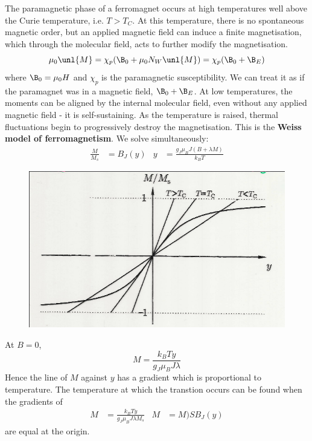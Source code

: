 \documentclass[a4paper, 11pt, normalem]{report}
\begin{document}
The paramagnetic phase of a ferromagnet occurs at high temperatures well above the Curie temperature, i.e. $T > T_C$.
At this temperature, there is no spontaneous magnetic order, but an applied magnetic field can induce a finite magnetisation, which through the molecular field, acts to further modify the magnetisation.
\begin{equation}
    \mu_0\unl{M} = \chi_p(\B_0 + \mu_0N_W\unl{M}) = \chi_p(\B_0 + \B_E)
\end{equation}
where $\B_0 = \mu_0H$ and $\chi_p$ is the paramagnetic susceptibility. 
We can treat it as if the paramagnet was in a magnetic field, $\B_0 + \B_E$.
At low temperatures, the moments can be aligned by the internal molecular field, even without any applied magnetic field - it is self-sustaining. 
As the temperature is raised, thermal fluctuations begin to progressively destroy the magnetisation.
This is the \textbf{Weiss model of ferromagnetism}.
We solve simultaneously:
\begin{align}
    \frac{M}{M_s} &= B_J(y) & y &= \frac{g_J\mu_BJ(B + \lambda M)}{k_BT}
\end{align}
\begin{figure}[H]
    \centering
    \includegraphics[scale=0.5]{janet.png}
\end{figure}
At $B=0$,
\begin{equation}
    M = \frac{k_BTy}{g_J\mu_BJ\lambda}
\end{equation}
Hence the line of $M$ against $y$ has a gradient which is proportional to temperature. 
The temperature at which the transtion occurs can be found when the gradients of 
\begin{align}
    M &= \frac{k_BTy}{g_J\mu_BJ\lambda M_s} & M &= M)SB_J(y) 
\end{align}
are equal at the origin.
\end{document}
